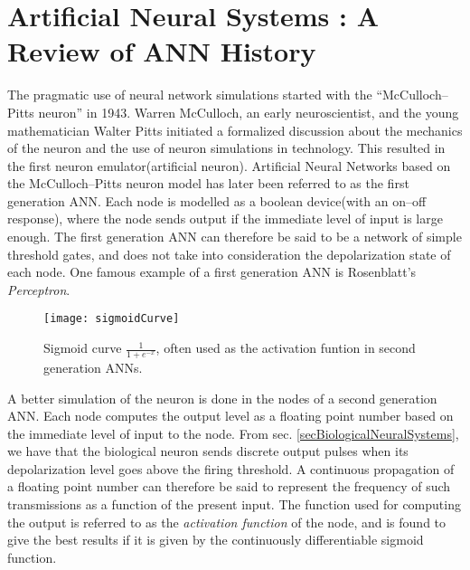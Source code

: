 

\section{Artificial Neural Systems : A Review of ANN History}
	\label{ssecHistoryOfANN}
	The pragmatic use of neural network simulations started with the ``McCulloch--Pitts neuron'' in 1943.
	Warren McCulloch, an early neuroscientist, and the young mathematician Walter Pitts initiated a formalized discussion about the mechanics of the neuron and the use of neuron simulations in technology.
	This resulted in the first neuron emulator(artificial neuron). 
%
	Artificial Neural Networks based on the McCulloch--Pitts neuron model has later been referred to as the first generation ANN\cite{Maass97networksofSN}.
	Each node is modelled as a boolean device(with an on--off response), where the node sends output if the immediate level of input is large enough.
	The first generation ANN can therefore be said to be a network of simple threshold gates, 
		and does not take into consideration the depolarization state of each node. %
	One famous example of a first generation ANN is Rosenblatt's \emph{Perceptron}\cite{HaykinANNbok}.

\begin{figure}[bth!p]
	\centering
	\texttt{[image: sigmoidCurve]}
	\caption[The sigmoid curve that is often used to compute the output of a node in second generation ANNs]{Sigmoid curve $\frac{1}{1+e^{-x}}$, often used as the activation funtion in second generation ANNs.}
	\label{figSigmoidCurve}
\end{figure}

	A better simulation of the neuron is done in the nodes of a second generation ANN\cite{Maass97networksofSN, NEVR3004OmModellane}.
	Each node computes the output level as a floating point number based on the immediate level of input to the node.
	From sec. \ref{secBiologicalNeuralSystems}, we have that the biological neuron sends discrete output pulses when its depolarization level goes above the firing threshold.
	A continuous propagation of a floating point number can therefore be said to represent the frequency of such transmissions as a function of the present input.
	The function used for computing the output is referred to as the \emph{activation function} of the node, and is found to give the best results if it is given by the continuously differentiable sigmoid function\cite{HaykinANNbok}.

